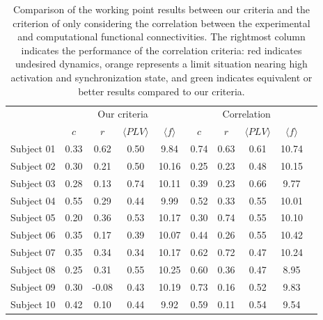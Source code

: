 \documentclass[../main.tex]{subfiles}
\begin{document}
\begin{table}[!htb]
 \caption{Comparison of the working point results between our criteria and the criterion of only considering the correlation between the experimental and computational functional connectivities.
 The rightmost column indicates the performance of the correlation criteria: red indicates undesired dynamics, orange represents a limit situation nearing high activation and synchronization state, and green indicates equivalent or better results compared to our criteria.}
    \def\arraystretch{1.3}%
    \centering
    \begin{tabular}{|c||c|c|c|c||c|c|c|c||c|}
        \hline
         & \multicolumn{4}{c||}{Our criteria} & \multicolumn{4}{c||}{Correlation} & 
         \multirow{2}{5mm}{} \\
         \cline{2-9}
         \cline{2-9}
         & $c $&  $r$ & $\langle PLV \rangle$ & $\langle f \rangle$ & $c$ &$r$ & $\langle PLV \rangle$ & $\langle f \rangle$ & \\
         \hline
        Subject 01  & 0.33 &	0.62  & 0.50 & 9.84  & 0.74 & 0.63 & 0.61 & 10.74 &  \cellcolor{red} \\
        \hline
        Subject 02  & 0.30 &	0.21  & 0.50 & 10.16 & 0.25 & 0.23 & 0.48 & 10.15 & \cellcolor{green}\\
        \hline
        Subject 03  & 0.28 & 0.13  & 0.74 & 10.11 & 0.39 & 0.23 & 0.66 &  9.77 & \cellcolor{orange}\\
        \hline
        Subject 04  & 0.55 &	0.29  & 0.44 & 9.99  & 0.52	& 0.33 & 0.55 &  10.01 & \cellcolor{green}\\
        \hline
        Subject 05  & 0.20 & 0.36  & 0.53 & 10.17 & 0.30	& 0.74 & 0.55 &	 10.10 & \cellcolor{green}\\
        \hline
        Subject 06  & 0.35 & 0.17  & 0.39 & 10.07 & 0.44	& 0.26 & 0.55 & 10.42 & \cellcolor{orange}\\
        \hline
        Subject 07  & 0.35 & 0.34  & 0.34 & 10.17 & 0.62	& 0.72 & 0.47 & 10.24 & \cellcolor{red}\\
        \hline
        Subject 08  & 0.25 & 0.31  & 0.55 & 10.25 & 0.60 & 0.36 & 0.47 & 8.95 & \cellcolor{red} \\
        \hline
        Subject 09  & 0.30 & -0.08 &	0.43 & 10.19 & 0.73	& 0.16 & 0.52 & 9.83 & \cellcolor{red} \\
        \hline
        Subject 10 & 0.42 & 0.10  & 0.44 & 9.92 & 0.59 & 0.11 & 0.54 & 9.54 & \cellcolor{red} \\ 
        \hline
    \end{tabular}
    \label{tab:working-point}
\end{table}
\end{document}
